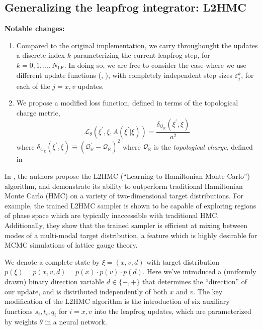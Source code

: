 \documentclass{article} %
\begin{document}
\subsection{\label{sec:l2hmc}Generalizing the leapfrog integrator: L2HMC}
%
\textbf{Notable changes:} 
\begin{enumerate}
   \item Compared to the original implementation, we carry throughought the updates a discrete index \(k\)
      parameterizing the current leapfrog step, for \(k = 0, 1, \ldots, N_{\mathrm{LF}}\).%
      In doing so, we are free to consider the case where we use different update functions
      (, ), with completely independent step sizes
      \(\varepsilon^{k}_{j}\), for each of the \(j = x, v\) updates.
   \item We propose a modified loss function, defined in terms of the topological charge metric,
      \begin{equation}
         \mathcal{L}_{\theta}{\left(\xi^{\prime},\xi,A(\xi^{\prime}|\xi)\right)} =
         \frac{\delta_{\mathcal{Q}_{\mathbb{R}}}(\xi^{\prime}, \xi)}{a^{2}}
      \end{equation}
      where \(\delta_{\mathcal{Q}_{\mathbb{R}}}(\xi^{\prime}, \xi) \equiv%
      {(\mathcal{Q}_{\mathbb{R}}^{\prime} - \mathcal{Q}_{\mathbb{R}})}^{2}\) where \(\mathcal{Q}_{\mathbb{R}}\) is the
      \emph{topological charge}, defined in 
\end{enumerate}
%

In \citep{levy2017}, the authors propose the L2HMC (``Learning to Hamiltonian Monte Carlo'') algorithm, and demonstrate
its ability to outperform traditional Hamiltonian Monte Carlo (HMC) on a variety of two-dimensional target
distributions.
%
For example, the trained L2HMC sampler is shown to be capable of exploring regions of phase space which are typically
inaccessible with traditional HMC.\@
%
Additionally, they show that the trained sampler is efficient at mixing between modes of a multi-modal target
distribution, a feature which is highly desirable for MCMC simulations of lattice gauge theory.
%


We denote a complete state by \(\xi = (x, v, d)\) with target distribution \(p(\xi) = p(x, v, d) = p(x)\cdot p(v)\cdot
p(d)\).
%
Here we've introduced a (uniformly drawn) binary direction variable \(d\in\{-,+\}\) that determines the ``direction'' of
our update, and is distributed independently of both \(x\) and \(v\).
%
The key modification of the L2HMC algorithm is the introduction of six auxiliary functions \(s_{i}, t_{i}, q_{i}\) for \(i
= x, v\) into the leapfrog updates, which are parameterized by weights \(\theta\) in a neural network.
%
%
\end{document}
